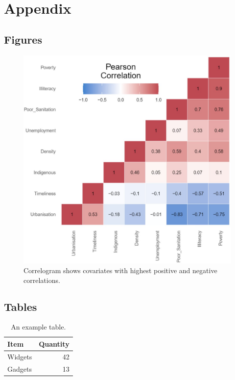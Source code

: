 
\section{Appendix}

\subsection{Figures}

\begin{figure}[H]
\centering
\includegraphics[scale=0.5]{pearson_correl.jpg}
\caption{\label{fig:pearson_correl}Correlogram shows covariates with highest positive and negative correlations.}
\end{figure}

\subsection{Tables}

\begin{table}[H]
\centering
\begin{tabular}{l|r}
Item & Quantity \\\hline
Widgets & 42 \\
Gadgets & 13
\end{tabular}
\caption{\label{tab:widgets}An example table.}
\end{table}

